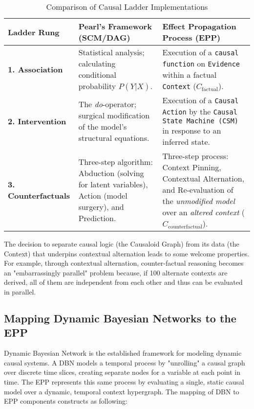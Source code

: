 \begin{table}[h!]
    \centering
    \caption{Comparison of Causal Ladder Implementations}
    \label{tab:ladder_comparison}
    \begin{tabular}{|l|p{5.5cm}|p{5.5cm}|}
        \hline
        \textbf{Ladder Rung} & \textbf{Pearl's Framework (SCM/DAG)} & \textbf{Effect Propagation Process (EPP)} \\
        \hline
        \textbf{1. Association} &
        Statistical analysis; calculating conditional probability $P(Y|X)$. &
        Execution of a \texttt{causal function} on \texttt{Evidence} within a factual \texttt{Context} ($C_{\text{factual}}$). \\
        \hline
        \textbf{2. Intervention} &
        The \textit{do}-operator; surgical modification of the model's structural equations. &
        Execution of a \texttt{Causal Action} by the \texttt{Causal State Machine (CSM)} in response to an inferred state. \\
        \hline
        \textbf{3. Counterfactuals} &
        Three-step algorithm: Abduction (solving for latent variables), Action (model surgery), and Prediction. &
        Three-step process: Context Pinning, Contextual Alternation, and Re-evaluation of the \textit{unmodified model} over an \textit{altered context} ($C_{\text{counterfactual}}$). \\
        \hline
    \end{tabular}
\end{table}

The decision to separate causal logic (the Causaloid Graph) from its data (the Context) that underpins
contextual alternation leads to some welcome properties. For example, through contextual alternation,  counter-factual reasoning becomes an "embarrassingly parallel" problem because, if 100 alternate contexts are derived, all of them are independent from each other and thus can be evaluated in parallel.

\subsection{Mapping Dynamic Bayesian Networks to the EPP}
\label{sec:epp_Dynamic_Bayesian_Networks}

Dynamic Bayesian Network is the established framework for modeling dynamic causal systems. A DBN models a temporal process by "unrolling" a causal graph over discrete time slices, creating separate nodes for a variable at each point in time. The EPP represents this same process by evaluating a single, static causal model over a dynamic, temporal context hypergraph. The mapping of DBN to EPP components constructs as following:

